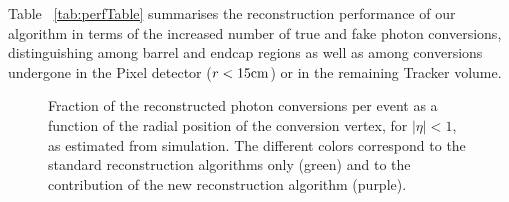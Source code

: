 \documentclass[a4paper]{jpconf}
\begin{document}
 Table ~\ref{tab:perfTable} summarises the reconstruction performance of our algorithm in terms of the increased number of true and fake photon conversions, distinguishing among barrel and endcap regions as well as among conversions undergone in the Pixel detector ($r < 15 \rm cm$) or in the remaining Tracker volume.
 
  

\begin{figure}[h]
\begin{center}
\caption{\label{fig:effPerf}
Fraction of the reconstructed photon conversions per event as  a function of the radial position of the conversion vertex,   for  $|\eta|<1$, as estimated
from simulation. The different colors correspond to the standard reconstruction algorithms only (green) and to the contribution of the new reconstruction algorithm (purple).}
\end{center}
\end{figure}


\end{document}
